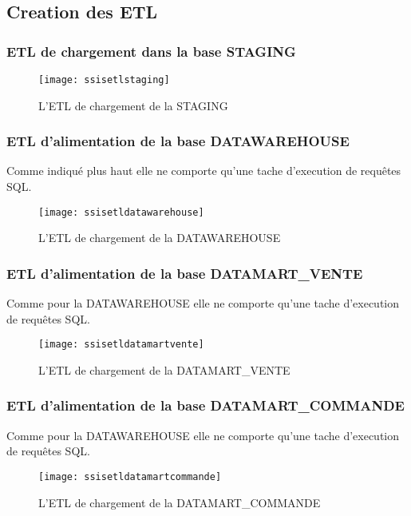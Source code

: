 \subsection{Creation des ETL}
\subsubsection{ETL de chargement dans la base STAGING}

\begin{figure}[H]
    \centering
    \texttt{[image: ssisetlstaging]}
    \caption{L'ETL de chargement de la STAGING}
    \label{fig:ssisetlstaging}
\end{figure}

\subsubsection{ETL d'alimentation de la base DATAWAREHOUSE}
Comme indiqué plus haut elle ne comporte qu'une tache d'execution de requêtes SQL.

\begin{figure}[H]
    \centering
    \texttt{[image: ssisetldatawarehouse]}
    \caption{L'ETL de chargement de la DATAWAREHOUSE}
    \label{fig:ssisetldatawarehouse}
\end{figure}

\subsubsection{ETL d'alimentation de la base DATAMART\_VENTE}
Comme pour la DATAWAREHOUSE elle ne comporte qu'une tache d'execution de requêtes SQL.
\begin{figure}[H]
    \centering
    \texttt{[image: ssisetldatamartvente]}
    \caption{L'ETL de chargement de la DATAMART\_VENTE}
    \label{fig:ssisetldatamartvente}
\end{figure}

\subsubsection{ETL d'alimentation de la base DATAMART\_COMMANDE}
Comme pour la DATAWAREHOUSE elle ne comporte qu'une tache d'execution de requêtes SQL.
\begin{figure}[H]
    \centering
    \texttt{[image: ssisetldatamartcommande]}
    \caption{L'ETL de chargement de la DATAMART\_COMMANDE}
    \label{fig:ssisetldatamartcommande}
\end{figure}


